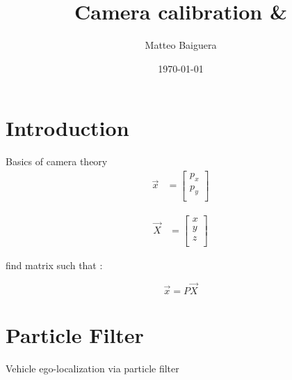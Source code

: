 \documentclass[•]{article}
\begin{document}
\title{Camera calibration \& }
\author{Matteo Baiguera}
\maketitle


\date{\today}

\section{Introduction}
Basics of camera theory 
\begin{align}
    \vec{x} &= \begin{bmatrix}
           	    p_x  \\
           		p_y \\
         \end{bmatrix}
\end{align}

\begin{align}
    \vec{X} &= \begin{bmatrix}
           	    x  \\
           		 y \\
           		 z \\
         \end{bmatrix}
\end{align}


find matrix such that : 

\begin{equation}
\vec{x} = P \vec{X}
\end{equation}
\section{Particle Filter}
Vehicle ego-localization via particle filter
\end{document}
